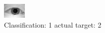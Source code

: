 \begin{figure}[h!]
\begin{center}
\includegraphics[width=0.60\columnwidth]{figures/ID997_class_1_target_2.png}
\end{center}
\caption{ Classification: 1 actual target: 2}
\label{fig:ID997_class_1_target_2}
\end{figure}
